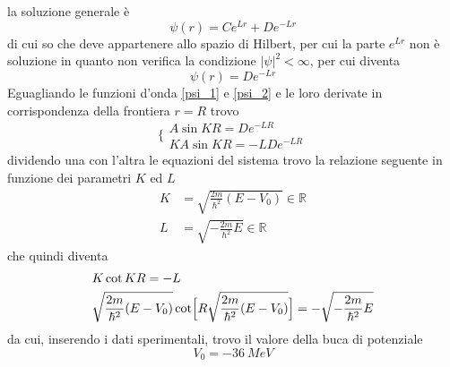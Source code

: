 la soluzione generale è
\begin{equation}
\psi(r) = C e^{L r} + D e^{- L r}
\end{equation}
di cui so che deve appartenere allo spazio di Hilbert, per cui la parte $e^{L r}$ non è soluzione in quanto non verifica la condizione $|\psi|^2 < \infty$, per cui diventa
\begin{equation}
\psi(r) = D e^{- L r} 
\label{psi_2}
\end{equation}
Eguagliando le funzioni d'onda \ref{psi_1} e \ref{psi_2} e le loro derivate in corrispondenza della frontiera $r = R$ trovo
\begin{equation}
\Bigg\{\begin{array}{l}
A \sin K R = D e^{ - L R }\\
K A \sin K R = -L D e^{ - L R }
\end{array}
\end{equation}
dividendo una con l'altra le equazioni del sistema trovo la relazione seguente in funzione dei parametri $K$ ed $L$
\begin{equation}
\begin{split}
K & = \sqrt{\frac{2m}{\hbar^2} (E - V_0)} \in \mathbb{R} \\
L & = \sqrt{- \frac{2m}{\hbar^2} E} \in \mathbb{R}
\end{split}
\end{equation}
che quindi diventa
\begin{equation}
\begin{split}
& K \cot K R = - L \\
& \sqrt{\frac{2m}{\hbar^2} (E - V_0)} \cot \Bigl[ R \sqrt{\frac{2m}{\hbar^2} (E - V_0)} \Bigr] = - \sqrt{- \frac{2m}{\hbar^2} E}
\end{split}
\end{equation}
da cui, inserendo i dati sperimentali, trovo il valore della buca di potenziale
\begin{equation}
V_0 = \SI{-36}{MeV}
\end{equation}












